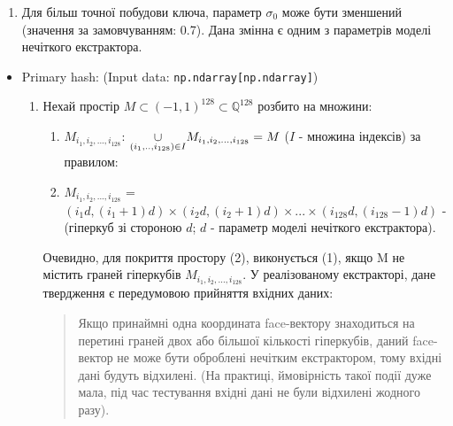 \documentclass[11pt]{article}
\providecommand{\tightlist}{%
      \setlength{\itemsep}{0pt}\setlength{\parskip}{0pt}}
\begin{document}
\begin{itemize}
\begin{itemize}
    \begin{enumerate}
    \def\labelenumi{\arabic{enumi}.}
    \setcounter{enumi}{1}
    \tightlist
    \item
      Для більш точної побудови ключа, параметр \(\sigma_0\) може бути
      зменшений (значення за замовчуванням: 0.7). Дана змінна є одним з
      параметрів моделі нечіткого екстрактора.
    \end{enumerate}
  \end{itemize}
\end{itemize}

    \begin{itemize}
\tightlist
\item
  Primary hash: (Input data:
  \texttt{np.ndarray{[}np.ndarray{]}})

  \begin{enumerate}
  \def\labelenumi{\arabic{enumi}.}
  \item
    Нехай простір \(M \subset (-1,1)^{128} \subset \mathbb{Q}^{128}\)
    розбито на множини:

    \begin{enumerate}
    \def\labelenumii{(\arabic{enumii})}
    \item
      \(M_{i_1,i_2,...,i_{128}}\):
      \(\space \underset{(i_1,..,i_{128}) \in I}{\large{\cup}}  {\small{M}_{i_1,i_2,...,i_{128}}} = M\)
      (\(I\) - множина індексів) за правилом:
    \item
      \(M_{i_1,i_2,...,i_{128}}\) =
      \((i_1d,(i_1+1)d)\times(i_2d,(i_2+1)d)\times...\times(i_{128}d,(i_{128}-1)d)\)
      - (гіперкуб зі стороною \(d\); \(d\) - параметр моделі нечіткого
      екстрактора).
    \end{enumerate}

    Очевидно, для покриття простору (2), виконується (1), якщо M не
    містить граней гіперкубів \(M_{i_1,i_2,...,i_{128}}\). У
    реалізованому екстракторі, дане твердження є передумовою прийняття
    вхідних даних:

    \begin{quote}
    Якщо принаймні одна координата face-вектору знаходиться на перетині
    граней двох або більшої кількості гіперкубів, даний face-вектор не
    може бути оброблені нечітким екстрактором, тому вхідні дані будуть
    відхилені. (На практиці, ймовірність такої події дуже мала, під час
    тестування вхідні дані не були відхилені жодного разу).\\
    \end{quote}
    

\end{enumerate}
\end{itemize}
\end{document}
